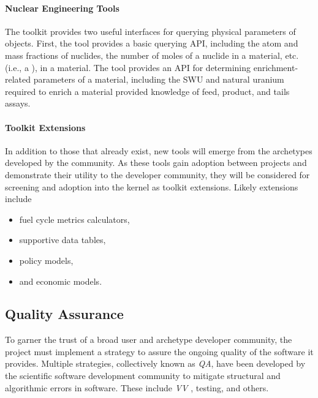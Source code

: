 \paragraph{Nuclear Engineering Tools}

The \Cyclus toolkit provides two useful interfaces for querying physical parameters of 
objects. First, the  tool
provides a basic querying \gls{API}, including the atom and mass fractions of
nuclides, the number of moles of a nuclide in a material, etc. (i.e., a
), in a material. The
 tool provides an \gls{API} for determining enrichment-related
parameters of a material, including the \gls{SWU} and natural
uranium required to enrich a material provided knowledge of feed, product, and tails
assays.

\paragraph{Toolkit Extensions}

In addition to those that already exist, new tools will
emerge from the archetypes developed by the community. As these tools gain adoption between projects and demonstrate their
utility to the developer community, they will be considered for screening and
adoption into the kernel as toolkit extensions. Likely extensions include

\begin{itemize}
\item fuel cycle metrics calculators,
\item supportive data tables,
\item policy models,
\item and economic models.
\end{itemize}

\subsection{Quality Assurance}



To garner the trust of a broad user and archetype developer community, the
\Cyclus project must implement a strategy to assure the ongoing quality of the
software it provides.  Multiple strategies, collectively known as
\emph{\gls{QA}}, have been developed by the scientific software development
community to mitigate structural and algorithmic errors in software. These
include \emph{\gls{VV}} \cite{boehm_software_1989}, testing, and others.

